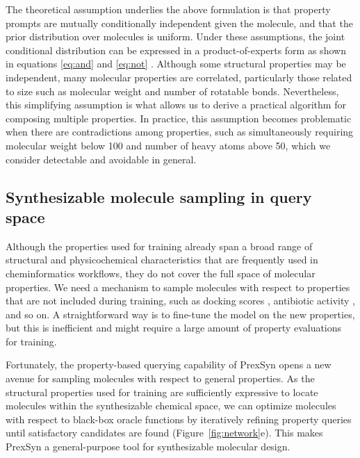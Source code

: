 The theoretical assumption underlies the above formulation is that property prompts are mutually conditionally independent given the molecule, and that the prior distribution over molecules is uniform.
Under these assumptions, the joint conditional distribution can be expressed in a product-of-experts form as shown in equations \ref{eq:and} and \ref{eq:not} \citep{hinton1999poe}.
Although some structural properties may be independent, many molecular properties are correlated, particularly those related to size such as molecular weight and number of rotatable bonds.
Nevertheless, this simplifying assumption is what allows us to derive a practical algorithm for composing multiple properties.
In practice, this assumption becomes problematic when there are contradictions among properties, such as simultaneously requiring molecular weight below 100 and number of heavy atoms above 50, which we consider detectable and avoidable in general.


\subsection{Synthesizable molecule sampling in query space}
\label{sec:method:optimization}


Although the properties used for training already span a broad range of structural and physicochemical characteristics that are frequently used in cheminformatics workflows, they do not cover the full space of molecular properties.
We need a mechanism to sample molecules with respect to properties that are not included during training, such as docking scores \citep{autodockgpu}, antibiotic activity \citep{stokes2020deep}, and so on.
A straightforward way is to fine-tune the model on the new properties, but this is inefficient and might require a large amount of property evaluations for training.

Fortunately, the property-based querying capability of PrexSyn opens a new avenue for sampling molecules with respect to general properties.
As the structural properties used for training are sufficiently expressive to locate molecules within the synthesizable chemical space, we can optimize molecules with respect to black-box oracle functions by iteratively refining property queries until satisfactory candidates are found (Figure~\ref{fig:network}e).
This makes PrexSyn a general-purpose tool for synthesizable molecular design.


